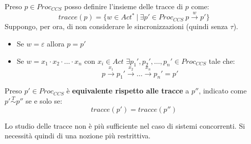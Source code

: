 Preso $p \in Proc_{CCS}$ posso definire l'insieme delle tracce di $p$ come:
\begin{equation}
    tracce(p) = \{w \in Act^{\ast}\ |\ \exists p' \in Proc_{CCS} \ p \xrightarrow{w} p'\}
\end{equation}
Suppongo, per ora, di non considerare le sincronizzazioni (quindi senza $\tau$).
\begin{itemize}
    \item Se $w = \varepsilon$ allora $p =  p'$
    \item Se $w = x_1 \cdot x_2 \cdot \dots \cdot x_n$ con $x_i \in Act$
          $\exists p_1', p_2', \dots, p_n' \in Proc_{CCS}$ tale che:
          $$p \xrightarrow{x_1} p_1' \xrightarrow{x_2} \dots \xrightarrow{x_n} p_n' = p'$$
\end{itemize}
\begin{teorema}
    Preso $p' \in Proc_{CCS}$ è \textbf{equivalente rispetto alle tracce} a $p''$,
    indicato come $p' \stackrel{T}{\sim}  p''$ se e solo se:
    \begin{equation}
        tracce(p') = tracce(p'')
    \end{equation}
\end{teorema}
Lo studio delle tracce non è più sufficiente nel caso di sistemi concorrenti.
Si necessità quindi di una nozione più restrittiva.
